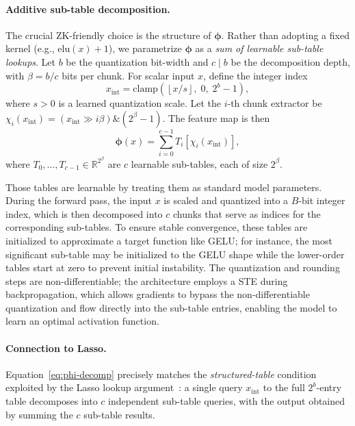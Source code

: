 \documentclass{article}
\newcommand{\RR}{\mathbb{R}}          %
\newcommand{\bphi}{\boldsymbol{\phi}} %
\newcommand{\bits}{b}                 %
\newcommand{\chunks}{c}               %
\newcommand{\chunkbits}{\beta}        %
\begin{document}
\paragraph{Additive sub-table decomposition.}
The crucial ZK-friendly choice is the structure of $\bphi$.  Rather
than adopting a fixed kernel (e.g., $\mathrm{elu}(x){+}1$), we parametrize $\bphi$ as a
\emph{sum of learnable sub-table lookups}.  Let $\bits$ be the
quantization bit-width and $\chunks \mid \bits$ be the decomposition
depth, with $\chunkbits = \bits/\chunks$ bits per chunk.  For scalar
input $x$, define the integer index
\begin{equation}
  x_{\mathrm{int}}
  = \mathrm{clamp}\!\left(\left\lfloor x / s \right\rfloor,\;
                           0,\; 2^\bits - 1\right),
  \label{eq:quant-index}
\end{equation}
where $s>0$ is a learned quantization scale.  Let the $i$-th chunk
extractor be $\chi_i(x_{\mathrm{int}})
=(x_{\mathrm{int}}\gg i\chunkbits)\mathbin{\&}(2^{\chunkbits}-1)$.
The feature map is then
\begin{equation}
  \bphi(x) = \sum_{i=0}^{\chunks-1} T_i\!\left[\chi_i(x_{\mathrm{int}})\right],
  \label{eq:phi-decomp}
\end{equation}
where $T_0,\ldots,T_{\chunks-1}\in\RR^{2^{\chunkbits}}$ are $\chunks$
learnable sub-tables, each of size $2^{\chunkbits}$.

Those tables are learnable by treating them as standard model parameters. During the forward pass, the input $x$ is scaled and quantized into a $B$-bit integer index, which is then decomposed into $c$ chunks that serve as indices for the corresponding sub-tables. To ensure stable convergence, these tables are initialized to approximate a target function like GELU; for instance, the most significant sub-table may be initialized to the GELU shape while the lower-order tables start at zero to prevent initial instability. The quantization and rounding steps are non-differentiable; the architecture employs a STE during backpropagation, which allows gradients to bypass the non-differentiable quantization and flow directly into the sub-table entries, enabling the model to learn an optimal activation function.

\paragraph{Connection to Lasso.}
Equation~\eqref{eq:phi-decomp} precisely matches the \emph{structured-table} condition exploited by the Lasso lookup argument~\cite{arun2024jolt,setty2024unlocking}: a single query $x_{\mathrm{int}}$ to the full $2^\bits$-entry table decomposes into $\chunks$ independent sub-table queries, with the output obtained by summing the $\chunks$ sub-table results. 
\end{document}
